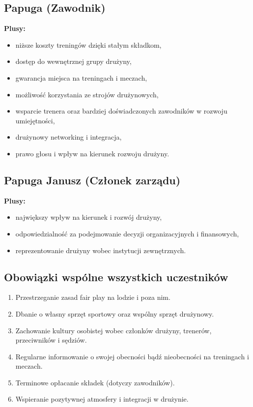 \documentclass[12pt,a4paper]{article}
\begin{document}
\subsection{Papuga (Zawodnik)}
\textbf{Plusy:}
\begin{itemize}
    \item niższe koszty treningów dzięki stałym składkom,
    \item dostęp do wewnętrznej grupy drużyny,
    \item gwarancja miejsca na treningach i meczach,
    \item możliwość korzystania ze strojów drużynowych,
    \item wsparcie trenera oraz bardziej doświadczonych zawodników w rozwoju umiejętności,
    \item drużynowy networking i integracja,
    \item prawo głosu i wpływ na kierunek rozwoju drużyny.
\end{itemize}

\subsection{Papuga Janusz (Członek zarządu)}
\textbf{Plusy:}
\begin{itemize}
    \item największy wpływ na kierunek i rozwój drużyny,
    \item odpowiedzialność za podejmowanie decyzji organizacyjnych i finansowych,
    \item reprezentowanie drużyny wobec instytucji zewnętrznych.
\end{itemize}

\subsection{Obowiązki wspólne wszystkich uczestników}
\begin{enumerate}
    \item Przestrzeganie zasad fair play na lodzie i poza nim.
    \item Dbanie o własny sprzęt sportowy oraz wspólny sprzęt drużynowy.
    \item Zachowanie kultury osobistej wobec członków drużyny, trenerów, przeciwników i sędziów.
    \item Regularne informowanie o swojej obecności bądź nieobecności na treningach i meczach.
    \item Terminowe opłacanie składek (dotyczy zawodników).
    \item Wspieranie pozytywnej atmosfery i integracji w drużynie.
\end{enumerate}
\end{document}
